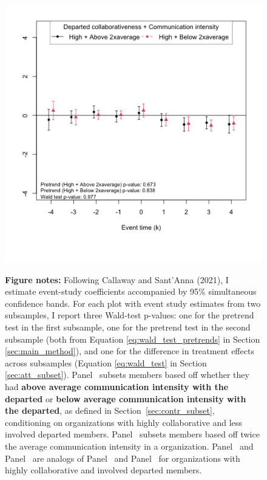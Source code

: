 \begin{figure}[htbp]
\begin{minipage}[b]{0.49\textwidth}
    \end{minipage}
    \hfill
    \begin{minipage}[b]{0.49\textwidth}
        \centering
         \label{fig:predep_prs_opened_collab_comm_int_marg_inv0_avg1}
        \includegraphics[width=\textwidth]{temp/output/collab_imp/inv1_cs_norm_prs_opened_dept_comm_2avg_above_High.png}
    \end{minipage}
  \begin{minipage}{1\textwidth}
    \textbf{Figure notes:} 
    Following Callaway and Sant’Anna (2021), I estimate event-study coefficients accompanied by 95\% simultaneous confidence bands. For each plot with event study estimates from two subsamples, I report three Wald-test p-values: one for the pretrend test in the first subsample, one for the pretrend test in the second subsample (both from Equation \ref{eq:wald_test_pretrends} in Section \ref{sec:main_method}), and one for the difference in treatment effects across subsamples (Equation \ref{eq:wald_test} in Section \ref{sec:att_subset}). Panel~ subsets members based off whether they had \textbf{above average communication intensity with the departed} or \textbf{below average communication intensity with the departed}, as defined in Section~\ref{sec:contr_subset}, conditioning on organizations with highly collaborative and less involved departed members. Panel~ subsets members based off twice the average communication intensity in a organization. Panel~ and Panel~ are analogs of Panel~ and Panel~ for organizations with highly collaborative and involved departed members.

\end{minipage}
\end{figure}
